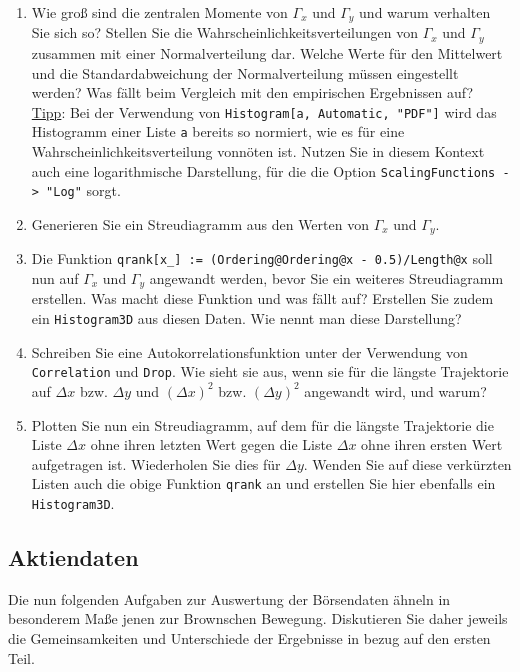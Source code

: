 \documentclass[a4paper,10pt]{article}
\begin{document}
\begin{enumerate}
 \item Wie groß sind die zentralen Momente von $\Gamma_x$ und $\Gamma_y$ und warum verhalten Sie sich so? Stellen Sie die Wahrscheinlichkeitsverteilungen von $\Gamma_x$ und $\Gamma_y$ zusammen mit einer Normalverteilung dar. Welche Werte für den Mittelwert und die Standardabweichung der Normalverteilung müssen eingestellt werden? Was fällt beim Vergleich mit den empirischen Ergebnissen auf? \\ \uline{Tipp}: Bei der Verwendung von \texttt{Histogram[a, Automatic, "PDF"]} wird das Histogramm einer Liste \texttt{a} bereits so normiert, wie es für eine Wahrscheinlichkeitsverteilung vonnöten ist. Nutzen Sie in diesem Kontext auch eine logarithmische Darstellung, für die die Option \texttt{ScalingFunctions -> "Log"} sorgt.
 \item Generieren Sie ein Streudiagramm aus den Werten von $\Gamma_x$ und $\Gamma_y$.
 \item Die Funktion \texttt{qrank[x\_] := (Ordering@Ordering@x - 0.5)/Length@x} soll nun auf $\Gamma_x$ und $\Gamma_y$ angewandt werden, bevor Sie ein weiteres Streudiagramm erstellen. Was macht diese Funktion und was fällt auf? Erstellen Sie zudem ein \texttt{Histogram3D} aus diesen Daten. Wie nennt man diese Darstellung?
 \item Schreiben Sie eine Autokorrelationsfunktion unter der Verwendung von \texttt{Correlation} und \texttt{Drop}. Wie sieht sie aus, wenn sie für die längste Trajektorie auf $\Delta x$ bzw. $\Delta y$ und $(\Delta x)^2$ bzw. $(\Delta y)^2$ angewandt wird, und warum?
 \item Plotten Sie nun ein Streudiagramm, auf dem für die längste Trajektorie die Liste $\Delta x$ ohne ihren letzten Wert gegen die Liste $\Delta x$ ohne ihren ersten Wert aufgetragen ist. Wiederholen Sie dies für $\Delta y$. Wenden Sie auf diese verkürzten Listen auch die obige Funktion \texttt{qrank} an und erstellen Sie hier ebenfalls ein \texttt{Histogram3D}.
\end{enumerate}

\newpage

\subsection{Aktiendaten}
Die nun folgenden Aufgaben zur Auswertung der Börsendaten ähneln in besonderem Maße jenen zur Brownschen Bewegung. Diskutieren Sie daher jeweils die Gemeinsamkeiten und Unterschiede der Ergebnisse in bezug auf den ersten Teil.
\end{document}
